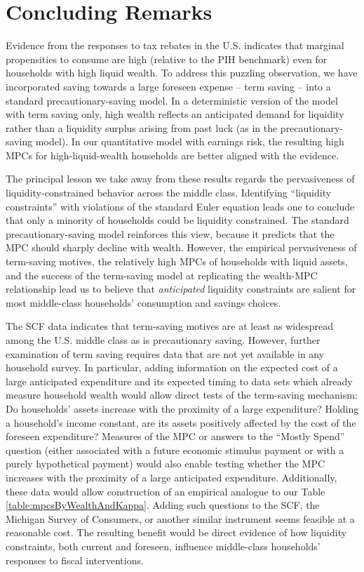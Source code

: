 \documentclass[fleqccn,12pt]{article}
\begin{document}
\section{Concluding Remarks\label{concluding remarks}}

Evidence from the responses to tax rebates in the U.S. indicates that marginal propensities to consume are high (relative to the PIH benchmark) even for households with high liquid wealth. To address this puzzling observation, we have incorporated saving towards a large foreseen expense -- term saving -- into a standard precautionary-saving model. In a deterministic version of the model with term saving only, high wealth reflects an anticipated demand for liquidity rather than a liquidity surplus arising from past luck (as in the precautionary-saving model). In our quantitative model with earnings risk, the resulting high MPCs for high-liquid-wealth households are better aligned with the evidence.

The principal lesson we take away from these results regards the pervasiveness of liquidity-constrained behavior across the middle class. Identifying ``liquidity constraints'' with violations of the standard Euler equation leads one to conclude that only a minority of households could be liquidity constrained. The standard precautionary-saving model reinforces this view, because it predicts that the MPC should sharply decline with wealth. However, the empirical pervasiveness of term-saving motives, the relatively high MPCs of households with liquid assets, and the success of the term-saving model at replicating the wealth-MPC relationship lead us to believe that \emph{anticipated} liquidity constraints are salient for most middle-class households' consumption and savings choices.

The SCF data indicates that term-saving motives are at least as widespread among the U.S. middle class as is precautionary saving. However, further examination of term saving requires data that are not yet available in any household survey. In particular, adding information on the expected cost of a large anticipated expenditure and its expected timing to data sets which already measure household wealth would allow direct tests of the term-saving mechanism: Do households' assets increase with the proximity of a large expenditure? Holding a household's income constant, are its assets positively affected by the cost of the foreseen expenditure? Measures of the MPC or answers to the \cite{aer2003ShapiroSlemrod} ``Mostly Spend'' question (either associated with a future economic stimulus payment or with a purely hypothetical payment) would also enable testing whether the MPC increases with the proximity of a large anticipated expenditure. Additionally, these data would allow construction of an empirical analogue to our Table \ref{table:mpcsByWealthAndKappa}. Adding such questions to the SCF, the Michigan Survey of Consumers, or another similar instrument seems feasible at a reasonable cost. The resulting benefit would be direct evidence of how liquidity constraints, both current and foreseen, influence middle-class households' responses to fiscal interventions.
\end{document}
